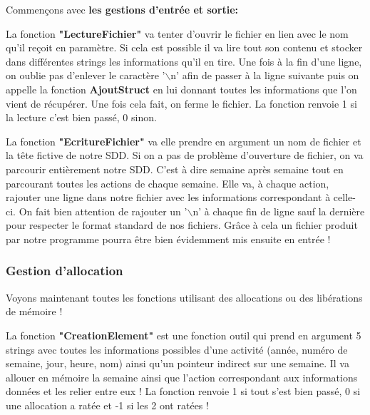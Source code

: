 \documentclass[12pt,french]{article} %
\begin{document}
Commençons avec \textbf{les gestions d'entrée et sortie:}\newline

La fonction \textbf{"LectureFichier"} va tenter d'ouvrir le fichier en lien avec le nom qu'il reçoit en paramètre. Si cela est possible il va lire tout son contenu et stocker dans différentes strings les informations qu'il en tire. Une fois à la fin d'une ligne, on oublie pas d'enlever le caractère '$\backslash$n' afin de passer à la ligne suivante puis on appelle la fonction \textbf{AjoutStruct} en lui donnant toutes les informations que l'on vient de récupérer. Une fois cela fait, on ferme le fichier. La fonction renvoie 1 si la lecture c'est bien passé, 0 sinon.\newline

La fonction \textbf{"EcritureFichier"} va elle prendre en argument un nom de fichier et la tête fictive de notre SDD. Si on a pas de problème d'ouverture de fichier, on va parcourir entièrement notre SDD. C'est à dire semaine après semaine tout en parcourant toutes les actions de chaque semaine. Elle va, à chaque action, rajouter une ligne dans notre fichier avec les informations correspondant à celle-ci. On fait bien attention de rajouter un '$\backslash$n' à chaque fin de ligne sauf la dernière pour respecter le format standard de nos fichiers. Grâce à cela un fichier produit par notre programme pourra être bien évidemment mis ensuite en entrée !

\subsubsection{Gestion d'allocation}

Voyons maintenant toutes les fonctions utilisant des allocations ou des libérations de mémoire !\newline

La fonction \textbf{"CreationElement"} est une fonction outil qui prend en argument 5 strings avec toutes les informations possibles d'une activité (année, numéro de semaine, jour, heure, nom) ainsi qu'un pointeur indirect sur une semaine. Il va allouer en mémoire la semaine ainsi que l'action correspondant aux informations données et les relier entre eux ! 
La fonction renvoie 1 si tout s'est bien passé, 0 si une allocation a ratée et -1 si les 2 ont ratées !\newline
\end{document}
